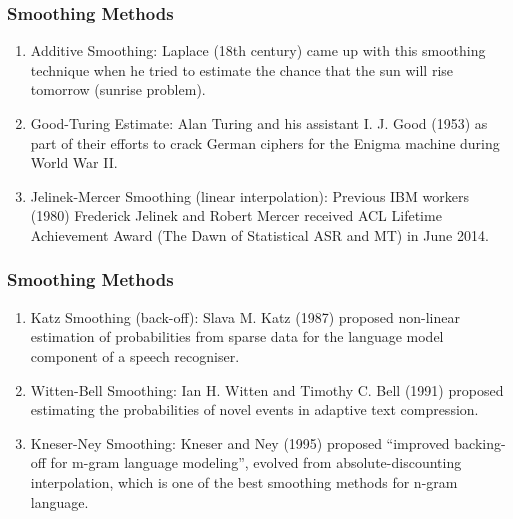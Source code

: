 \documentclass{beamer}
\begin{document}

\begin{frame}\frametitle{Smoothing Methods}

\begin{enumerate}
\item Additive Smoothing:  Laplace (18th century) came up with this smoothing
  technique when he tried to estimate the chance that the sun will
  rise tomorrow (sunrise problem).  
\item Good-Turing Estimate: Alan Turing and his assistant I. J. Good
  (1953) as part of their efforts to crack German ciphers for the Enigma
 machine during World War II. 

\item Jelinek-Mercer Smoothing (linear interpolation):  Previous IBM workers
  (1980) Frederick Jelinek and Robert Mercer received ACL Lifetime
  Achievement Award (The Dawn of Statistical ASR and MT) in June 2014.  

\end{enumerate}

\end{frame}


\begin{frame}\frametitle{Smoothing Methods}

\begin{enumerate}
\item Katz Smoothing (back-off):  Slava M. Katz (1987) proposed
  non-linear estimation of probabilities from sparse data for the
  language model component of a speech recogniser.  
\item Witten-Bell Smoothing: Ian H. Witten and Timothy C. Bell (1991)
  proposed estimating the probabilities of novel events in adaptive
  text compression.  
\item Kneser-Ney Smoothing:
   Kneser and Ney (1995) proposed ``improved backing-off for m-gram language
   modeling'',  evolved from absolute-discounting interpolation, which
   is one of the best smoothing methods for n-gram language.  

\end{enumerate}

\end{frame}
\end{document}
